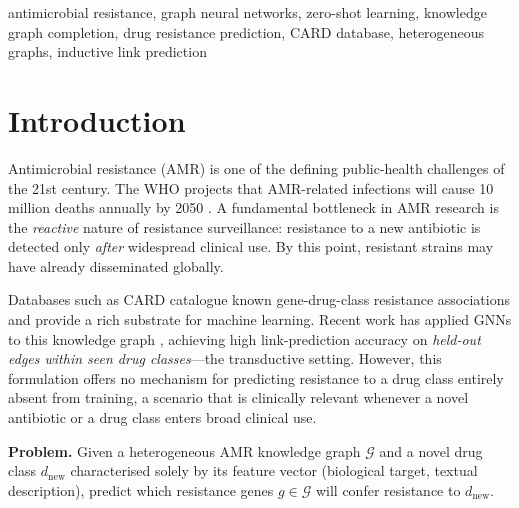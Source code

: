 \documentclass[conference]{IEEEtran}
\begin{document}
\begin{IEEEkeywords}
antimicrobial resistance, graph neural networks, zero-shot learning,
knowledge graph completion, drug resistance prediction, CARD database,
heterogeneous graphs, inductive link prediction
\end{IEEEkeywords}


\section{Introduction}

Antimicrobial resistance (AMR) is one of the defining public-health
challenges of the 21st century. The WHO projects that AMR-related
infections will cause 10 million deaths annually by 2050
\cite{WHO2019amr}. A fundamental bottleneck in AMR research is the
\emph{reactive} nature of resistance surveillance: resistance to a new
antibiotic is detected only \emph{after} widespread clinical use. By
this point, resistant strains may have already disseminated globally.

Databases such as CARD \cite{CARD2023} catalogue known
gene-drug-class resistance associations and provide a rich substrate for
machine learning. Recent work has applied GNNs to this knowledge graph
\cite{Arango2022amrgnn,Zhang2021hetgnn}, achieving high link-prediction
accuracy on \emph{held-out edges within seen drug classes}—the
transductive setting. However, this formulation offers no mechanism for
predicting resistance to a drug class entirely absent from training, a
scenario that is clinically relevant whenever a novel antibiotic or a
drug class enters broad clinical use.

\textbf{Problem.} Given a heterogeneous AMR knowledge graph
$\mathcal{G}$ and a novel drug class $d_{\mathrm{new}}$ characterised
solely by its feature vector (biological target, textual description),
predict which resistance genes $g \in \mathcal{G}$ will confer resistance
to $d_{\mathrm{new}}$.
\end{document}

